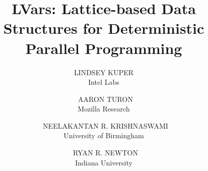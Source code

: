 \documentclass{../latex_common/jfp1}
\title{LVars: Lattice-based Data Structures for Deterministic Parallel Programming}
\author[L. Kuper, A. Turon, N. R. Krishnaswami, and R. R. Newton]
       {LINDSEY KUPER\\
          Intel Labs\\
        \and\ AARON TURON\\
          Mozilla Research\\
        \and\ NEELAKANTAN R. KRISHNASWAMI\\
          University of Birmingham\\
        \and\ RYAN R. NEWTON\\
        Indiana University}
\let\oldsection\section
\let\oldsubsection\subsection
\let\oldsubsubsection\subsubsection
\renewcommand{\section}[1]{\oldsubsection{#1}}
\renewcommand{\subsection}[1]{\oldsubsubsection{#1}}
\begin{document}
\label{firstpage}

\maketitle

\begin{abstract}

\end{abstract}








\renewcommand{\section}{\oldsection}


\end{document}
